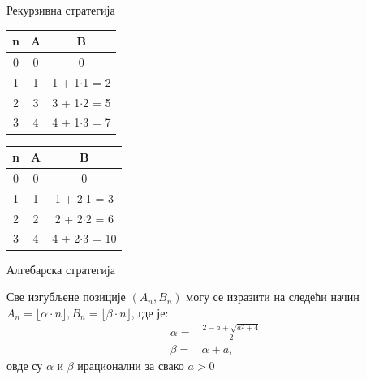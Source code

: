 \documentclass[10pt]{beamer}
\newcommand{\examplebox}[2]{
\begin{tcolorbox}[colframe=darkcardinal,colback=boxgray,title=#1]
#2
\end{tcolorbox}}
\DeclareMathOperator{\equal}{=}
\begin{document}
	\begin{frame}{Рекурзивна стратегија}
		\examplebox{За $ a \equal 1 $ неке изгубљене позиције су:}{
		\begin{table}[h!]
			\begin{center}
				\begin{tabular}{  c | c | c }
					{\textbf{n}} &  {\textbf{A}} &  {\textbf{B}} \\
					\hline
					0 & 0 & 0 \\
					1 & 1 & 1 + 1$ \cdot $1 = 2 \\
					2 & 3 & 3 + 1$ \cdot $2 = 5 \\
					3 & 4 & 4 + 1$ \cdot $3 = 7 
				\end{tabular}
			\end{center}
		\end{table}}
		\examplebox{За $ a \equal 2 $ неке изгубљене позиције су:}{
			\begin{table}[h!]
				\begin{center}
					\begin{tabular}{  c | c | c }
						{\textbf{n}} &  {\textbf{A}} &  {\textbf{B}} \\
						\hline
						0 & 0 & 0 \\
						1 & 1 & 1 + 2$ \cdot $1 = 3\\
						2 & 2 & 2 + 2$ \cdot $2 = 6\\
						3 & 4 & 4 + 2$ \cdot $3 = 10
					\end{tabular}
				\end{center}
		\end{table}}
	\end{frame}

	\begin{frame}{Алгебарска стратегија}
		\begin{tcolorbox}[title=Алгебарска карактеризација изгубљених позиција]
			Све изгубљене позиције $ (A_{n}, B_{n}) $ могу се изразити на следећи начин $ A_{n} = \lfloor \alpha \cdot n \rfloor, B_{n} = \lfloor \beta \cdot n \rfloor $, где је:
			\begin{eqnarray*}
				&\alpha = &\frac{2 - a + \sqrt{a^2 + 4}}{2} \label{def:alpha}\\  
				&\beta = &\alpha + a \label{def:beta},
			\end{eqnarray*}
	    	овде су $ \alpha $ и $ \beta $ ирационални за свако $ a > 0 $
		\end{tcolorbox}
	\end{frame}
	
\end{document}
